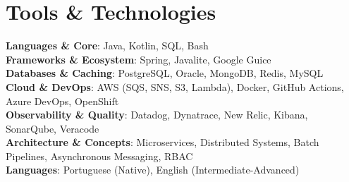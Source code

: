 \section{Tools \& Technologies}
\begin{itemize}[leftmargin=0.15in, label={}]
  \small{\item{
    \textbf{Languages \& Core}{: Java, Kotlin, SQL, Bash} \\
    \textbf{Frameworks \& Ecosystem}{: Spring, Javalite, Google Guice} \\
    \textbf{Databases \& Caching}{: PostgreSQL, Oracle, MongoDB, Redis, MySQL} \\
    \textbf{Cloud \& DevOps}{: AWS (SQS, SNS, S3, Lambda), Docker, GitHub Actions, Azure DevOps, OpenShift} \\
    \textbf{Observability \& Quality}{: Datadog, Dynatrace, New Relic, Kibana, SonarQube, Veracode} \\
    \textbf{Architecture \& Concepts}{: Microservices, Distributed Systems, Batch Pipelines, Asynchronous Messaging, RBAC} \\
    \textbf{Languages}{: Portuguese (Native), English (Intermediate-Advanced)} \\
  }}
\end{itemize}
